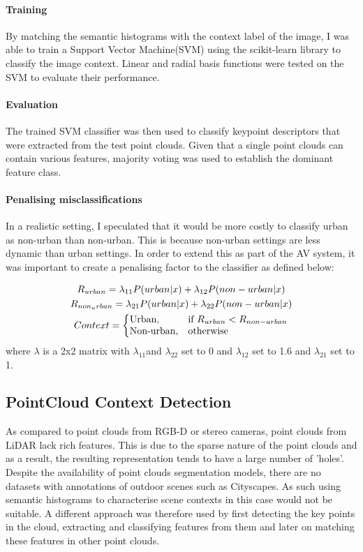 \paragraph{Training}By matching the semantic histograms with the context label of the image, I was able to train a Support Vector Machine(SVM) using the scikit-learn library to classify the image context. Linear and radial basis functions were tested on the SVM to evaluate their performance.
\paragraph{Evaluation} The trained SVM classifier was then used to classify keypoint descriptors that were extracted from the test point clouds. Given that a single point clouds can contain various features, majority voting was used to establish the dominant feature class. 

\paragraph{Penalising misclassifications} In a realistic setting, I speculated that it would be more costly to classify urban as non-urban than non-urban. This is because non-urban settings are less dynamic than urban settings. In order to extend this as part of the AV system, it was important to create a penalising factor to the classifier as defined below: 

\noindent


\begin{gather*}
	R_{urban} = \lambda _{11}P(urban |x) + \lambda _{12}P(non-urban|x)  \\ 
	R_{non_urban} = \lambda_{21}P(urban|x) + \lambda _{22}P(non-urban|x)\\ 
	Context=\left\{
		\begin{array}{@{}ll@{}}
		\text{Urban}, & \text{if}\ R_{urban} < R_{non-urban}  \\
		\text{Non-urban}, & \text{otherwise}
		\end{array}\right.
\end{gather*} 
where $\lambda $ is a 2x2 matrix with $\lambda_{11}$and $\lambda_{22}$ set to 0 and $\lambda_{12}$ set to 1.6 and $\lambda_{21}$ set to 1.





\subsection{PointCloud Context Detection}
As compared to point clouds from RGB-D or stereo cameras, point clouds from LiDAR lack rich features. This is due to the sparse nature of the point clouds and as a result, the resulting representation tends to have a large number of 'holes'. Despite the availability of point clouds segmentation models, there are no datasets with annotations of outdoor scenes such as Cityscapes. As such using semantic histograms to characterise scene contexts in this case would not be suitable.
A different approach was therefore used by first detecting the key points in the cloud, extracting and classifying features from them and later on matching these features in other point clouds.  

